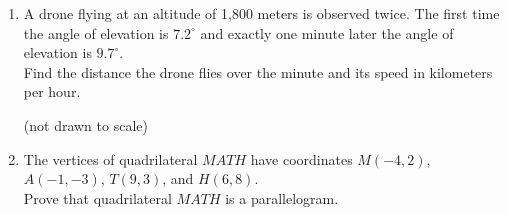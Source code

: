\begin{enumerate}
\newpage
\item A drone flying at an altitude of 1,800 meters is observed twice. The first time the angle of elevation is $7.2^\circ$ and exactly one minute later the angle of elevation is $9.7^\circ$. \\[0.25cm]
Find the distance the drone flies over the minute and its speed in kilometers per hour.

\hfill (not drawn to scale)
\begin{flushright}
\end{flushright}
\vspace{6cm}

\item The vertices of quadrilateral $MATH$ have coordinates $M(-4,2)$, $A(-1,-3)$, $T(9,3)$, and $H(6,8)$. \\[0.5cm]
Prove that quadrilateral $MATH$ is a parallelogram.

\end{enumerate}

  